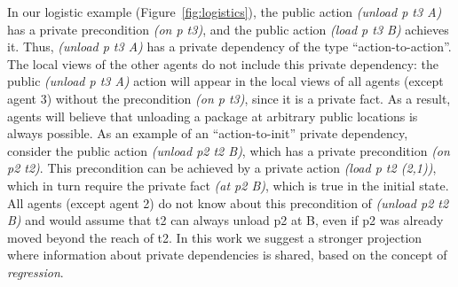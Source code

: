 \documentclass[letterpaper]{article}
\theoremstyle{definition}
\begin{document}

In our logistic example (Figure~\ref{fig:logistics}), the public action {\em (unload p t3 A)} has a private precondition {\em (on p t3)},
and the public action {\em (load p t3 B)} achieves it. Thus, {\em (unload p t3 A)} has a private dependency of the type ``action-to-action''.
The local views of the other agents do not include this private dependency: the public {\em (unload p t3 A)} action
will appear in the local views of all agents (except agent 3) without the precondition {\em (on p t3)}, since it is a private fact. As a result, agents will believe that unloading a package at arbitrary public locations is always possible.
As an example of an ``action-to-init'' private dependency, consider the public action {\em (unload p2 t2 B)}, which has a private precondition
{\em (on p2 t2)}. This precondition can be achieved by a private action {\em (load p t2 (2,1))}, which in turn require the private fact {\em (at p2 B)}, which is true in the initial state. All agents (except agent 2) do not know about this precondition of {\em (unload p2 t2 B)} and would assume that t2 can always unload p2 at B, even if p2 was already moved beyond the reach of t2.
In this work we suggest a stronger projection where information about private dependencies is shared, based on the concept of {\em regression}. %




\end{document}

